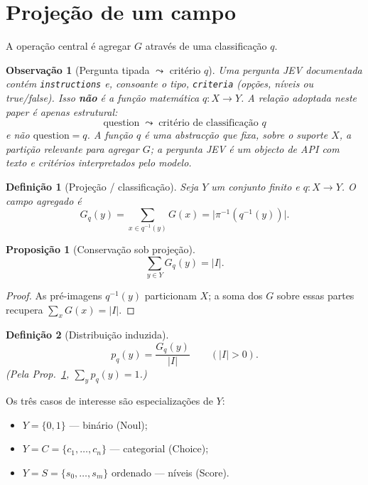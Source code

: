 \documentclass[11pt,a4paper]{article}
\newtheorem{definicao}{Definição}
\newtheorem{proposicao}{Proposição}
\newtheorem{observacao}{Observação}
\begin{document}
\section{Projeção de um campo}

A operação central é agregar \(G\) através de uma classificação \(q\).

\begin{observacao}[Pergunta tipada \(\leadsto\) critério \(q\)]
\label{obs:question-q}
Uma pergunta JEV documentada contém \texttt{instructions} e, consoante o tipo,
\texttt{criteria} (opções, níveis ou true/false). Isso \textbf{não} é a função
matemática \(q\colon X\to Y\). A relação adoptada neste paper é apenas
estrutural:
\[
\boxed{\text{question}\;\leadsto\;\text{critério de classificação }q}
\]
e não \(\text{question}=q\). A função \(q\) é uma abstracção que fixa, sobre o
suporte \(X\), a partição relevante para agregar \(G\); a pergunta JEV é um
objecto de API com texto e critérios interpretados pelo modelo.
\end{observacao}

\begin{definicao}[Projeção / classificação]
\label{def:projecao}
Seja \(Y\) um conjunto finito e \(q\colon X\to Y\). O campo agregado é
\[
G_q(y)=\sum_{x\in q^{-1}(y)}G(x)=\lvert\pi^{-1}(q^{-1}(y))\rvert.
\]
\end{definicao}

\begin{proposicao}[Conservação sob projeção]
\label{prop:gq-conserva}
\[
\sum_{y\in Y}G_q(y)=\lvert I\rvert.
\]
\end{proposicao}

\begin{proof}
As pré-imagens \(q^{-1}(y)\) particionam \(X\); a soma dos \(G\) sobre essas
partes recupera \(\sum_x G(x)=\lvert I\rvert\).
\end{proof}

\begin{definicao}[Distribuição induzida]
\label{def:pq}
\[
p_q(y)=\frac{G_q(y)}{\lvert I\rvert}\qquad(\lvert I\rvert>0).
\]
(Pela Prop.~\ref{prop:gq-conserva}, \(\sum_y p_q(y)=1\).)
\end{definicao}

Os três casos de interesse são especializações de \(Y\):
\begin{itemize}[leftmargin=1.5em]
\item \(Y=\{0,1\}\) --- binário (Noul);
\item \(Y=C=\{c_1,\dots,c_n\}\) --- categorial (Choice);
\item \(Y=S=\{s_0,\dots,s_m\}\) ordenado --- níveis (Score).
\end{itemize}
\end{document}
